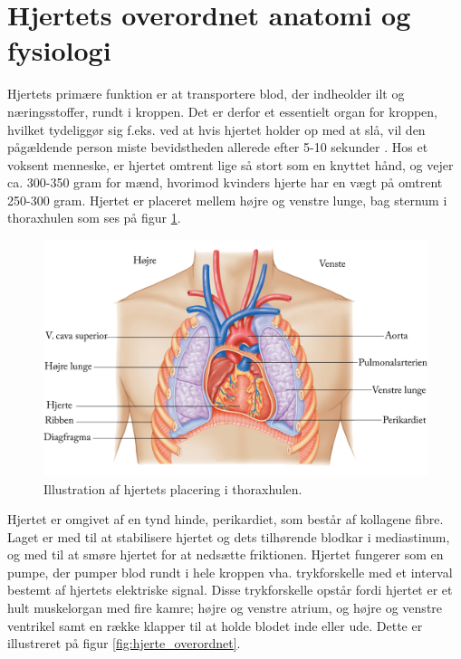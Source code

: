 \section{Hjertets overordnet anatomi og fysiologi}\label{Hjerte_ana_fys}

Hjertets primære funktion er at transportere blod, der indheolder ilt og næringsstoffer, rundt i kroppen. Det er derfor et essentielt organ for kroppen, hvilket tydeliggør sig f.eks. ved at hvis hjertet holder op med at slå, vil den pågældende person miste bevidstheden allerede efter 5-10 sekunder \cite{gronanatomi}. Hos et voksent menneske, er hjertet omtrent lige så stort som en knyttet hånd, og vejer ca. 300-350 gram for mænd, hvorimod kvinders hjerte har en vægt på omtrent 250-300 gram. Hjertet er placeret mellem højre og venstre lunge, bag sternum i thoraxhulen som ses på figur \ref{fig:hjerte_placering}. 

\begin{figure}[H] %
\begin{center}
\includegraphics[width=1\textwidth]{figures/thorax}
\end{center}
\caption{Illustration af hjertets placering i thoraxhulen. \cite{cindy}}
\label{fig:hjerte_placering}
\end{figure}

\noindent Hjertet er omgivet af en tynd hinde, perikardiet, som består af kollagene fibre. Laget er med til at stabilisere hjertet og dets tilhørende blodkar i mediastinum, og med til at smøre hjertet for at nedsætte friktionen. Hjertet fungerer som en pumpe, der pumper blod rundt i hele kroppen vha. trykforskelle med et interval bestemt af hjertets elektriske signal. Disse trykforskelle opstår fordi hjertet er et hult muskelorgan med fire kamre; højre og venstre atrium, og højre og venstre ventrikel samt en række klapper til at holde blodet inde eller ude. Dette er illustreret på figur \ref{fig:hjerte_overordnet}.

